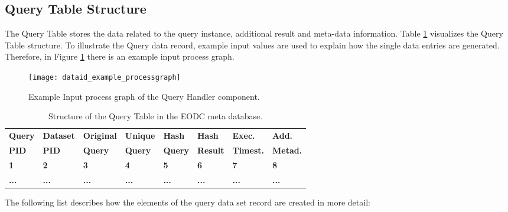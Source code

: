 \documentclass[draft,final]{vutinfth} %
\begin{document}
\subsection{Query Table Structure}

The Query Table stores the data related to the query instance, additional result and meta-data information. Table \ref{Tab:querytable} visualizes the Query Table structure. To illustrate the Query data record, example input values are used to explain how the single data entries are generated. Therefore, in Figure \ref{fig:processgraph_example} there is an example input process graph.   

\begin{figure}[h]
	\centering
	\texttt{[image: dataid\_example\_processgraph]}
	\caption{Example Input process graph of the Query Handler component.}
	\label{fig:processgraph_example} %
\end{figure}

\begin{table}[]
	\caption{Structure of the Query Table in the EODC meta database.}
	\begin{tabular}{|l|l|l|l|l|l|l|l|}
	\hline	\textbf{Query} & \textbf{Dataset} & \textbf{Original} & \textbf{Unique} & \textbf{Hash} & \textbf{Hash} &
		\textbf{Exec.} & \textbf{Add.}  \\ 
		\textbf{PID} & \textbf{PID} & \textbf{Query} & \textbf{Query} & \textbf{Query} & \textbf{Result} &
		\textbf{Timest.} & \textbf{Metad.}  \\ \hline
		\textbf{1} & \textbf{2} & \textbf{3} & \textbf{4} & \textbf{5} & \textbf{6} &
		\textbf{7} & \textbf{8} \\ \hline
		\textbf{...} & \textbf{...} & \textbf{...} & \textbf{...} & \textbf{...} & \textbf{...} & \textbf{...} & \textbf{...} \\ \hline
	\end{tabular}
	\label{Tab:querytable}
\end{table}

The following list describes how the elements of the query data set record are created in more detail:
\end{document}
